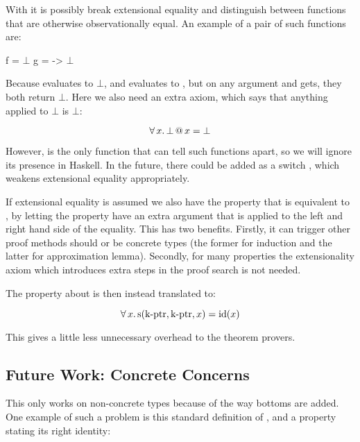 With  it is possibly break extensional equality and distinguish between
functions that are otherwise observationally equal. An example of a
pair of such functions are:

\begin{code}[mathescape]
f = $\bot$
g = \x -> $\bot$
\end{code}

Because  evaluates to $\bot$, and  evaluates
to \hs{()}, but on any argument  and  gets, they both
return $\bot$. Here we also need an extra axiom, which says that
anything applied to $\bot$ is $\bot$:

\begin{equation*}
\forall \, x . \, \bot \, @ \, x = \bot
\end{equation*}

However,  is the only function that can tell such functions
apart, so we will ignore its presence in Haskell.  In the future,
there could be added as a switch , which weakens
extensional equality appropriately.

If extensional equality is assumed we also have the property that
 is equivalent to , by letting the
property have an extra argument that is applied to the left and right
hand side of the equality. This has two benefits. Firstly, it can
trigger other proof methods should  or  be concrete types
(the former for induction and the latter for approximation
lemma). Secondly, for many properties the extensionality axiom which
introduces extra steps in the proof search is not needed.

The property about  is then instead translated to:

\begin{equation*}
\forall \, x . \, \mathrm{s}(\mathrm{\operatorname{k-ptr}},\mathrm{\operatorname{k-ptr}},x) = \mathrm{id}(x)
\end{equation*}

This gives a little less unnecessary overhead to the theorem provers.

\subsection{Future Work: Concrete Concerns}
\label{sec:concreteconcerns}

This only works on non-concrete types because of the way bottoms are
added. One example of such a problem is this standard definition of
\hs{\&\&}, and a property stating its right identity:

